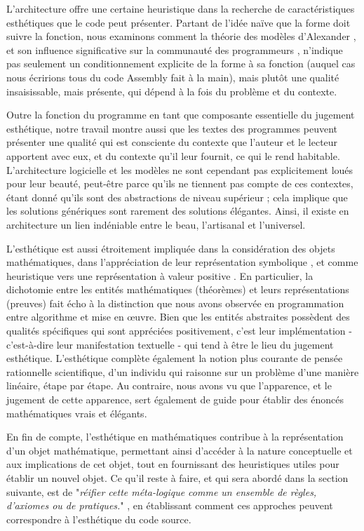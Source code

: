 \documentclass{article}
\begin{document}
L'architecture offre une certaine heuristique dans la recherche de caractéristiques esthétiques que le code peut présenter. Partant de l'idée naïve que la forme doit suivre la fonction, nous examinons comment la théorie des modèles d'Alexander \citep{alexander_pattern_1977}, et son influence significative sur la communauté des programmeurs \citep{gabriel_patterns_1998}, n'indique pas seulement un conditionnement explicite de la forme à sa fonction (auquel cas nous écririons tous du code Assembly fait à la main), mais plutôt une qualité insaisissable, mais présente, qui dépend à la fois du problème et du contexte.

Outre la fonction du programme en tant que composante essentielle du jugement esthétique, notre travail montre aussi que les textes des programmes peuvent présenter une qualité qui est consciente du contexte que l'auteur et le lecteur apportent avec eux, et du contexte qu'il leur fournit, ce qui le rend habitable. L'architecture logicielle et les modèles ne sont cependant pas explicitement loués pour leur beauté, peut-être parce qu'ils ne tiennent pas compte de ces contextes, étant donné qu'ils sont des abstractions de niveau supérieur ; cela implique que les solutions génériques sont rarement des solutions élégantes. Ainsi, il existe en architecture un lien indéniable entre le beau, l'artisanal et l'universel.

L'esthétique est aussi étroitement impliquée dans la considération des objets mathématiques, dans l'appréciation de leur représentation symbolique \citep{hardy_mathematician_2012,poincare_science_1908}, et comme heuristique vers une représentation à valeur positive \citep{sinclair_roles_2004}. En particulier, la dichotomie entre les entités mathématiques (théorèmes) et leurs représentations (preuves) fait écho à la distinction que nous avons observée en programmation entre algorithme et mise en œuvre. Bien que les entités abstraites possèdent des qualités spécifiques qui sont appréciées positivement, c'est leur implémentation - c'est-à-dire leur manifestation textuelle - qui tend à être le lieu du jugement esthétique. L'esthétique complète également la notion plus courante de pensée rationnelle scientifique, d'un individu qui raisonne sur un problème d'une manière linéaire, étape par étape. Au contraire, nous avons vu que l'apparence, et le jugement de cette apparence, sert également de guide pour établir des énoncés mathématiques vrais et élégants.

En fin de compte, l'esthétique en mathématiques contribue à la représentation d'un objet mathématique, permettant ainsi d'accéder à la nature conceptuelle et aux implications de cet objet, tout en fournissant des heuristiques utiles pour établir un nouvel objet. Ce qu'il reste à faire, et qui sera abordé dans la section suivante, est de "\emph{réifier cette méta-logique comme un ensemble de règles, d'axiomes ou de pratiques.}" \citep{root-bernstein_aesthetic_2002}, en établissant comment ces approches peuvent correspondre à l'esthétique du code source.
\end{document}

